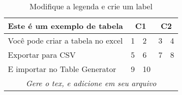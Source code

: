 \begin{table}[h!] %
\centering
\caption{Modifique a legenda e crie um label}
\label{tab2} %
\begin{tabular}{|l|l|l|l|l|}
\hline
\multicolumn{1}{|c|}{\textbf{Este é um exemplo de tabela}} & \multicolumn{2}{c|}{\textbf{C1}} & \multicolumn{2}{c|}{\textbf{C2}} \\ \hline
Você pode criar a tabela no excel                          & 1              & 2               & 3               & 4              \\ \hline
Exportar para CSV                                          & 5              & 6               & 7               & 8              \\ \hline
E importar no Table Generator                              & 9              & 10              &                 &                \\ \hline
\multicolumn{5}{|c|}{\textit{Gere o tex, e adicione em seu arquivo}}                                                             \\ \hline
\end{tabular}
\end{table}
